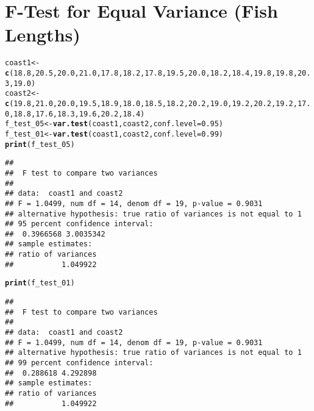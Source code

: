\documentclass{article}\usepackage[]{graphicx}\usepackage[]{xcolor}
\makeatletter
\newcommand{\hlnum}[1]{\textcolor[rgb]{0.686,0.059,0.569}{#1}}%
\newcommand{\hldef}[1]{\textcolor[rgb]{0.345,0.345,0.345}{#1}}%
\newcommand{\hlkwb}[1]{\textcolor[rgb]{0.69,0.353,0.396}{#1}}%
\newcommand{\hlkwc}[1]{\textcolor[rgb]{0.333,0.667,0.333}{#1}}%
\newcommand{\hlkwd}[1]{\textcolor[rgb]{0.737,0.353,0.396}{\textbf{#1}}}%
\newenvironment{kframe}{%
 \def\at@end@of@kframe{}%
 \ifinner\ifhmode%
  \def\at@end@of@kframe{\end{minipage}}%
  \begin{minipage}{\columnwidth}%
 \fi\fi%
 \def\FrameCommand##1{\hskip\@totalleftmargin \hskip-\fboxsep
 \colorbox{shadecolor}{##1}\hskip-\fboxsep
     \hskip-\linewidth \hskip-\@totalleftmargin \hskip\columnwidth}%
 \MakeFramed {\advance\hsize-\width
   \@totalleftmargin\z@ \linewidth\hsize
   \@setminipage}}%
 {\par\unskip\endMakeFramed%
 \at@end@of@kframe}
\newenvironment{knitrout}{}{} %
\makeatother
\begin{document}
\section{F-Test for Equal Variance (Fish Lengths)}
\begin{knitrout}
\color{fgcolor}\begin{kframe}
\begin{alltt}
\hldef{coast1} \hlkwb{<-} \hlkwd{c}\hldef{(}\hlnum{18.8}\hldef{,} \hlnum{20.5}\hldef{,} \hlnum{20.0}\hldef{,} \hlnum{21.0}\hldef{,} \hlnum{17.8}\hldef{,} \hlnum{18.2}\hldef{,} \hlnum{17.8}\hldef{,} \hlnum{19.5}\hldef{,} \hlnum{20.0}\hldef{,} \hlnum{18.2}\hldef{,} \hlnum{18.4}\hldef{,} \hlnum{19.8}\hldef{,} \hlnum{19.8}\hldef{,} \hlnum{20.3}\hldef{,} \hlnum{19.0}\hldef{)}
\hldef{coast2} \hlkwb{<-} \hlkwd{c}\hldef{(}\hlnum{19.8}\hldef{,} \hlnum{21.0}\hldef{,} \hlnum{20.0}\hldef{,} \hlnum{19.5}\hldef{,} \hlnum{18.9}\hldef{,} \hlnum{18.0}\hldef{,} \hlnum{18.5}\hldef{,} \hlnum{18.2}\hldef{,} \hlnum{20.2}\hldef{,} \hlnum{19.0}\hldef{,} \hlnum{19.2}\hldef{,} \hlnum{20.2}\hldef{,} \hlnum{19.2}\hldef{,} \hlnum{17.0}\hldef{,} \hlnum{18.8}\hldef{,} \hlnum{17.6}\hldef{,} \hlnum{18.3}\hldef{,} \hlnum{19.6}\hldef{,} \hlnum{20.2}\hldef{,} \hlnum{18.4}\hldef{)}
\hldef{f_test_05} \hlkwb{<-} \hlkwd{var.test}\hldef{(coast1, coast2,} \hlkwc{conf.level} \hldef{=} \hlnum{0.95}\hldef{)}
\hldef{f_test_01} \hlkwb{<-} \hlkwd{var.test}\hldef{(coast1, coast2,} \hlkwc{conf.level} \hldef{=} \hlnum{0.99}\hldef{)}
\hlkwd{print}\hldef{(f_test_05)}
\end{alltt}
\begin{verbatim}
## 
## 	F test to compare two variances
## 
## data:  coast1 and coast2
## F = 1.0499, num df = 14, denom df = 19, p-value = 0.9031
## alternative hypothesis: true ratio of variances is not equal to 1
## 95 percent confidence interval:
##  0.3966568 3.0035342
## sample estimates:
## ratio of variances 
##           1.049922
\end{verbatim}
\begin{alltt}
\hlkwd{print}\hldef{(f_test_01)}
\end{alltt}
\begin{verbatim}
## 
## 	F test to compare two variances
## 
## data:  coast1 and coast2
## F = 1.0499, num df = 14, denom df = 19, p-value = 0.9031
## alternative hypothesis: true ratio of variances is not equal to 1
## 99 percent confidence interval:
##  0.288618 4.292898
## sample estimates:
## ratio of variances 
##           1.049922
\end{verbatim}
\end{kframe}
\end{knitrout}
\end{document}
